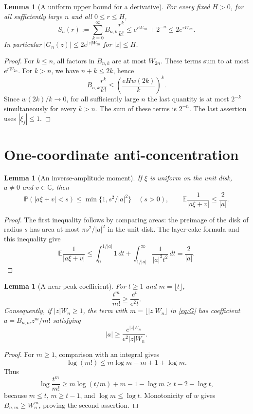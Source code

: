 \documentclass[11pt]{article}
\newtheorem{lemma}[theorem]{Lemma}
\theoremstyle{remark}
\newcommand{\C}{\mathbb C}
\newcommand{\E}{\mathbb E}
\newcommand{\Prob}{\mathbb P}
\newcommand{\dd}{\,d}
\begin{document}
\begin{lemma}[A uniform upper bound for a derivative]
\label{lem:upper}
For every fixed $H>0$, for all sufficiently large $n$ and all
$0\leq r\leq H$,
\begin{equation}\label{eq:Sn}
 S_n(r):=\sum_{k=0}^\infty B_{n,k}\frac{r^k}{k!}
 \leq e^{rW_{2n}}+2^{-n}\leq2e^{rW_{2n}}.
\end{equation}
In particular $|G_n(z)|\leq2e^{|z|W_{2n}}$ for $|z|\leq H$.
\end{lemma}
\begin{proof}
For $k\leq n$, all factors in $B_{n,k}$ are at most $W_{2n}$.
These terms sum to at most $e^{rW_{2n}}$.
For $k>n$, we have $n+k\leq2k$, hence
\[
 B_{n,k}\frac{r^k}{k!}
 \leq\left(\frac{eH w(2k)}{k}\right)^k.
\]
Since $w(2k)/k\to0$, for all sufficiently large $n$ the last
quantity is at most $2^{-k}$ simultaneously for every $k>n$.
The sum of these terms is $2^{-n}$. The last assertion uses
$|\xi_j|\leq1$.
\end{proof}

\section{One-coordinate anti-concentration}

\begin{lemma}[An inverse-amplitude moment]\label{lem:inverse}
If $\xi$ is uniform on the unit disk, $a\neq0$ and $v\in\C$, then
\begin{equation}\label{eq:smallball}
 \Prob(|a\xi+v|<s)\leq\min\{1,s^2/|a|^2\}\quad(s>0),
 \qquad \E\frac{1}{|a\xi+v|}\leq\frac{2}{|a|}.
\end{equation}
\end{lemma}
\begin{proof}
The first inequality follows by comparing areas: the preimage of the
disk of radius $s$ has area at most $\pi s^2/|a|^2$ in the unit disk.
The layer-cake formula and this inequality give
\[
 \E\frac1{|a\xi+v|}
 \leq\int_0^{1/|a|}1\dd t+
 \int_{1/|a|}^\infty\frac{1}{|a|^2t^2}\dd t
 =\frac{2}{|a|}.
\]
\end{proof}

\begin{lemma}[A near-peak coefficient]\label{lem:peak}
For $t\geq1$ and $m=\lfloor t\rfloor$,
\begin{equation}\label{eq:peakfactorial}
 \frac{t^m}{m!}\geq\frac{e^t}{e^2t}.
\end{equation}
Consequently, if $|z|W_n\geq1$, the term with
$m=\lfloor |z|W_n\rfloor$ in \eqref{eq:G} has coefficient
$a=B_{n,m}z^m/m!$ satisfying
\[
 |a|\geq \frac{e^{|z|W_n}}{e^2|z|W_n}.
\]
\end{lemma}
\begin{proof}
For $m\geq1$, comparison with an integral gives
\[
 \log(m!)\leq m\log m-m+1+\log m.
\]
Thus
\[
 \log\frac{t^m}{m!}
 \geq m\log(t/m)+m-1-\log m
 \geq t-2-\log t,
\]
because $m\leq t$, $m\geq t-1$, and $\log m\leq\log t$.
Monotonicity of $w$ gives $B_{n,m}\geq W_n^m$, proving
the second assertion.
\end{proof}
\end{document}
